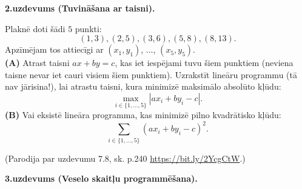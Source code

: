 \documentclass[a4paper]{article}
\begin{document}















\vspace{20pt}
{\bf 2.uzdevums (Tuvināšana ar taisni).}

Plaknē doti šādi $5$ punkti:
$$(1, 3), (2, 5), (3, 6), (5, 8), (8, 13).$$
Apzīmējam tos attiecīgi ar $(x_1,y_1)$, $\ldots$, $(x_5,y_5)$.\\
{\bf (A)} Atrast taisni $ax + by = c$, kas iet iespējami tuvu šiem punktiem (neviena taisne nevar 
iet cauri visiem šiem punktiem). Uzrakstīt li\-ne\-ā\-ru programmu (tā nav jārisina!), lai atrastu taisni, 
kura minimizē maksimālo absolūto kļūdu:
$$\max_{i \in \{1,\ldots,5\}} |ax_i + by_i - c|.$$
{\bf (B)} Vai eksistē lineāra programma, kas minimizē pilno kvadrātisko kļūdu: 
$$\sum\limits_{i \in \{1,\ldots,5\}} (ax_i + by_i - c)^2.$$

(Parodija par uzdevumu 7.8, sk. p.240 \url{https://bit.ly/2YcgCtW}.)



\vspace{20pt}
{\bf 3.uzdevums (Veselo skaitļu programmēšana).}
\end{document}
